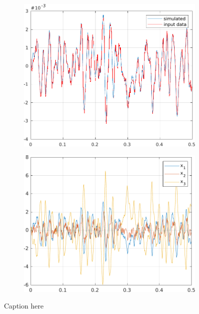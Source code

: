 \documentclass{scrartcl}
\begin{document}
\begin{figure}[h]
	\begin{subfigure}{0.49\textwidth}
		\includegraphics[width=\textwidth]{figures/ss_id_output.pdf}	
	\end{subfigure}
	\begin{subfigure}{0.49\textwidth}
		\includegraphics[width=\textwidth]{figures/ss_id_states.pdf}	
	\end{subfigure}
	\caption{Caption here}
	\label{fig:figure1}
\end{figure}
\end{document}

